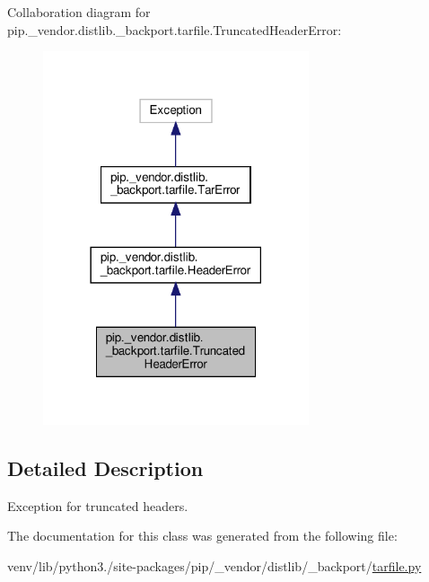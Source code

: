 Collaboration diagram for pip.\+\_\+vendor.\+distlib.\+\_\+backport.\+tarfile.\+Truncated\+Header\+Error\+:
\nopagebreak
\begin{figure}[H]
\begin{center}
\leavevmode
\includegraphics[width=222pt]{classpip_1_1__vendor_1_1distlib_1_1__backport_1_1tarfile_1_1TruncatedHeaderError__coll__graph}
\end{center}
\end{figure}


\subsection{Detailed Description}
\begin{DoxyVerb}Exception for truncated headers.\end{DoxyVerb}
 

The documentation for this class was generated from the following file\+:\begin{DoxyCompactItemize}
\item 
venv/lib/python3./site-\/packages/pip/\+\_\+vendor/distlib/\+\_\+backport/\hyperlink{tarfile_8py}{tarfile.\+py}\end{DoxyCompactItemize}
